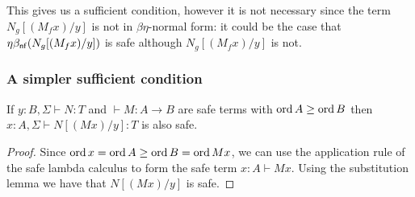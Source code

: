This gives us a sufficient condition, however it is not necessary since the term $N_g[(M_f x)/y]$ is not in $\beta\eta$-normal form: it could be the case that $\eta\beta_{\sf nf}(N_g[(M_f x) /y])$ is safe although  $N_g[(M_f x) /y]$ is not.

\subsubsection{A simpler sufficient condition}
%
%
%
%

\begin{lemma}
If $y:B, \Sigma \vdash N : T$ and $\vdash M : A \rightarrow B$ 
are safe terms with $\mathop{\mathrm{ord}}{A} \geq \mathop{\mathrm{ord}}{B}$
then $x:A, \Sigma \vdash N[(M x)/y] :T$ is also safe.
\end{lemma}
\begin{proof}
Since $\mathop{\mathrm{ord}}{x} = \mathop{\mathrm{ord}}{A} \geq \mathop{\mathrm{ord}}{B} = \mathop{\mathrm{ord}}{M x}$, we can use the application 
rule of the safe lambda calculus to form the safe term $x:A \vdash M x$.
Using the substitution lemma we have that $N[(M x)/y]$ is safe.
\end{proof}

